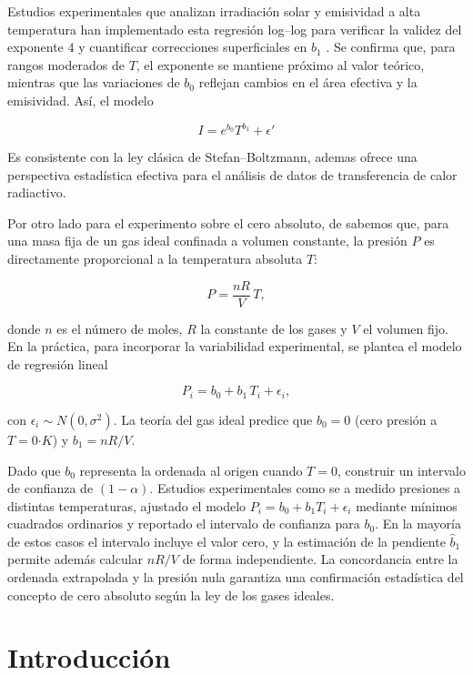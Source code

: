 \documentclass[12pt,a4paper]{config/myConfig}
\begin{document}
Estudios experimentales que analizan irradiación solar y emisividad a alta temperatura han implementado esta regresión log–log para verificar la validez del exponente \(4\)  y cuantificar correcciones superficiales en \(b_1\) \citep{smith2018emissivity}. Se confirma que, para rangos moderados de \(T\), el exponente se mantiene próximo al valor teórico, mientras que las variaciones de \(b_0\) reflejan cambios en el área efectiva y la emisividad. Así, el modelo

\[
I = e^{b_0} T^{b_1} + \epsilon'
\]

Es consistente con la ley clásica de Stefan–Boltzmann, ademas ofrece una perspectiva estadística efectiva para el análisis de datos de transferencia de calor radiactivo. 

Por otro lado para el experimento sobre el cero absoluto, de \citet{physicsTextbook} sabemos que, para una masa fija de un gas ideal confinada a volumen constante, la presión \(P\) es directamente proporcional a la temperatura absoluta \(T\):

\[
P = \frac{nR}{V}\,T,
\]

donde \(n\) es el número de moles, \(R\) la constante de los gases y \(V\) el volumen fijo. En la práctica, para incorporar la variabilidad experimental, se plantea el modelo de regresión lineal

\[
P_i = b_0 + b_1\,T_i + \epsilon_i,
\]

con \(\epsilon_i \sim N(0,\sigma^2)\). La teoría del gas ideal predice que \(b_0 = 0\) (cero presión a \(T=0\)$\cdot K$) y \(b_1 = nR/V\).

Dado que \(b_0\) representa la ordenada al origen cuando \(T=0\), construir un intervalo de confianza de \((1-\alpha)\). Estudios experimentales como \citet{jones2004determination} se a medido presiones a distintas temperaturas, ajustado el modelo \(P_i = b_0 + b_1T_i + \epsilon_i\) mediante mínimos cuadrados ordinarios y reportado el intervalo de confianza para \(b_0\).  En la mayoría de estos casos el intervalo incluye el valor cero, y la estimación de la pendiente \(\hat b_1\) permite además calcular \(nR/V\) de forma independiente.  La concordancia entre la ordenada extrapolada y la presión nula garantiza una confirmación estadística del concepto de cero absoluto según la ley de los gases ideales.


\section{Introducción}
\label{sec:INTRODUCCION}
\end{document}
